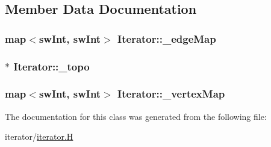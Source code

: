 \subsection{Member Data Documentation}
\hypertarget{classIterator_aedde11e435ff2559186706fdbbd3fe5a}{
\subsubsection[{\_\-edgeMap}]{\setlength{\rightskip}{0pt plus 5cm}map$<${\bf swInt}, {\bf swInt}$>$ {\bf Iterator::\_\-edgeMap}}}
\label{classIterator_aedde11e435ff2559186706fdbbd3fe5a}
\hypertarget{classIterator_a8c90147f6541ebb64ae6fb68d622a2fb}{
\subsubsection[{\_\-topo}]{$\ast$ {\bf Iterator::\_\-topo}}}
\label{classIterator_a8c90147f6541ebb64ae6fb68d622a2fb}
\hypertarget{classIterator_a3c329666d26e1f9d74a61b46adcadd74}{
\subsubsection[{\_\-vertexMap}]{\setlength{\rightskip}{0pt plus 5cm}map$<${\bf swInt}, {\bf swInt}$>$ {\bf Iterator::\_\-vertexMap}}}
\label{classIterator_a3c329666d26e1f9d74a61b46adcadd74}


The documentation for this class was generated from the following file:\begin{DoxyCompactItemize}
\item 
iterator/\hyperlink{iterator_8H}{iterator.H}\end{DoxyCompactItemize}
